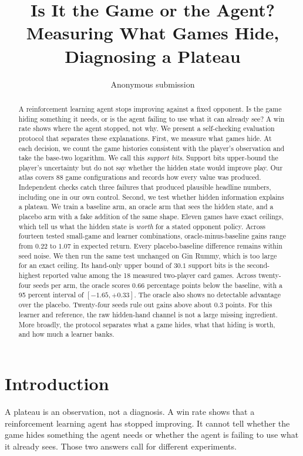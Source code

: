 \documentclass{article}
\title{Is It the Game or the Agent?\\
Measuring What Games Hide, Diagnosing a Plateau}
\author{Anonymous submission}
\date{}
\begin{document}
\maketitle

\begin{abstract}
A reinforcement learning agent stops improving against a fixed opponent. Is the game hiding something it needs, or is the agent failing to use what it can already see? A win rate shows where the agent stopped, not why. We present a self-checking evaluation protocol that separates these explanations. First, we measure what games hide. At each decision, we count the game histories consistent with the player's observation and take the base-two logarithm. We call this \emph{support bits}. Support bits upper-bound the player's uncertainty but do not say whether the hidden state would improve play. Our atlas covers 88 game configurations and records how every value was produced. Independent checks catch three failures that produced plausible headline numbers, including one in our own control. Second, we test whether hidden information explains a plateau. We train a baseline arm, an oracle arm that sees the hidden state, and a placebo arm with a fake addition of the same shape. Eleven games have exact ceilings, which tell us what the hidden state is \emph{worth} for a stated opponent policy. Across fourteen tested small-game and learner combinations, oracle-minus-baseline gains range from $0.22$ to $1.07$ in expected return. Every placebo-baseline difference remains within seed noise. We then run the same test unchanged on Gin Rummy, which is too large for an exact ceiling. Its hand-only upper bound of $30.1$ support bits is the second-highest reported value among the 18 measured two-player card games. Across twenty-four seeds per arm, the oracle scores $0.66$ percentage points below the baseline, with a 95 percent interval of $[-1.65, +0.33]$. The oracle also shows no detectable advantage over the placebo. Twenty-four seeds rule out gains above about $0.3$ points. For this learner and reference, the raw hidden-hand channel is not a large missing ingredient. More broadly, the protocol separates what a game hides, what that hiding is worth, and how much a learner banks.
\end{abstract}

\section{Introduction}

A plateau is an observation, not a diagnosis. A win rate shows that a reinforcement learning agent has stopped improving. It cannot tell whether the game hides something the agent needs or whether the agent is failing to use what it already sees. Those two answers call for different experiments.
\end{document}
